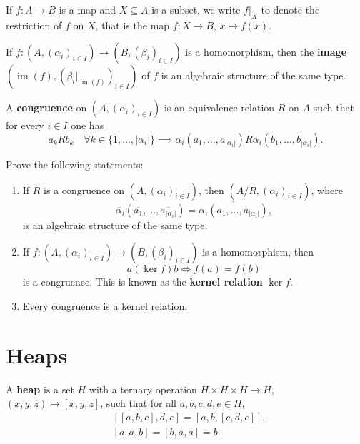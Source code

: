 \documentclass[graybox]{svmult}
\newcommand{\im}{\operatorname{im}}
\begin{document}
If $f\colon A\to B$ is a map and $X\subseteq A$ is a subset, 
we write $f|_X$ to denote 
the restriction of $f$ on $X$, that is the
map $f\colon X\to B$, $x\mapsto f(x)$. 

\begin{exercise}
    If $f\colon (A,(\alpha_i)_{i\in I})\to (B,(\beta_i)_{i\in I})$ is
    a homomorphism, then the \textbf{image}  
    $\left(\im(f),(\beta_i|_{\im(f)})_{i\in I}\right)$ of $f$ 
    is an algebraic structure of the same type. 
\end{exercise}

\begin{definition}
    A \textbf{congruence} on 
    $(A,(\alpha_i)_{i\in I})$ is an equivalence relation $R$ on $A$ 
    such that for every $i\in I$ one has 
    \[
    a_k R b_k\quad\forall k\in\{1,\dots,|\alpha_i|\}\implies \alpha_i(a_1,\dots,a_{|\alpha_i|}) R \alpha_i(b_1,\dots,b_{|\alpha_i|}).
    \]
\end{definition}

\begin{exercise}
Prove the following statements:
\begin{enumerate}
    \item If $R$ is a congruence on $(A,(\alpha_i)_{i\in I})$, then 
    $\left(A/R,(\overline{\alpha_i})_{i\in I}\right)$, 
    where 
    \[
    \overline{\alpha_i}(\overline{a_1},\dots,\overline{a_{|\alpha_i|}})
    =\overline{\alpha_i(a_1,\dots,a_{|\alpha_i|})},
    \]
    is an algebraic structure of the same type. 
    \item If $f\colon (A,(\alpha_i)_{i\in I})\to (B,(\beta_i)_{i\in I})$ is a homomorphism, 
    then 
    \[
    a(\ker f)b\Longleftrightarrow f(a)=f(b)
    \]
    is a congruence. This is known as the \textbf{kernel relation}
    $\ker f$.  
    \item Every congruence is a kernel relation. 
\end{enumerate}
\end{exercise}

\section{Heaps}

\begin{definition}
A \textbf{heap} is a set $H$ with a ternary operation $H\times H\times H\to H$, $(x,y,z)\mapsto [x,y,z]$, 
such that for all $a,b,c,d,e\in H$, 
\begin{align}
    \label{eq:associativity}&[[a,b,c],d,e]=[a,b,[c,d,e]],\\
    \label{eq:Malcev}&[a,a,b]=[b,a,a]=b.
\end{align}
\end{definition}
\end{document}
